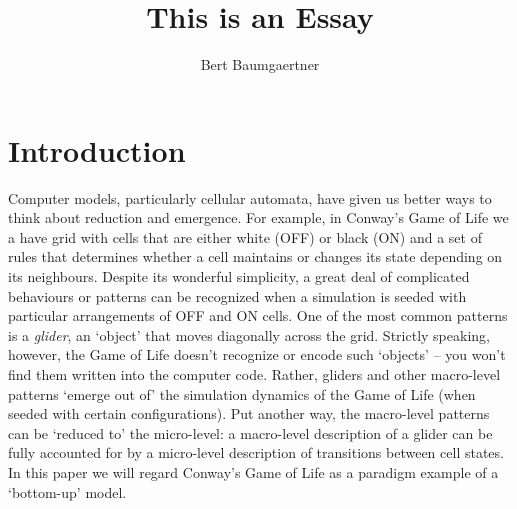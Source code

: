 \documentclass[11pt]{article}
\title{This is an Essay}
\author{Bert Baumgaertner}
\date{}
\begin{document}




\section{Introduction}


Computer models, particularly cellular automata, have given us better ways to think about reduction and emergence.  For example, in Conway's Game of Life we a have grid with cells that are either white (OFF) or black (ON) and a set of rules that determines whether a cell maintains or changes its state depending on its neighbours.  Despite its wonderful simplicity, a great deal of complicated behaviours or patterns can be recognized when a simulation is seeded with particular arrangements of OFF and ON cells.  One of the most common patterns is a \emph{glider}, an `object' that moves diagonally across the grid.  Strictly speaking, however, the Game of Life doesn't recognize or encode such `objects' -- you won't find them written into the computer code. Rather, gliders and other macro-level patterns `emerge out of' the simulation dynamics of the Game of Life (when seeded with certain configurations). Put another way, the macro-level patterns can be `reduced to' the micro-level: a macro-level description of a glider can be fully accounted for by a micro-level description of transitions between cell states.  In this paper we will regard Conway's Game of Life as a paradigm example of a `bottom-up' model. 

\end{document}
